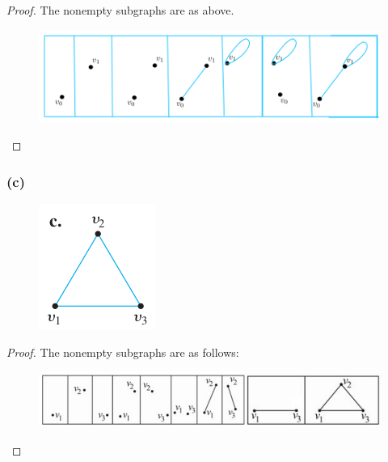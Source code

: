 \documentclass[14pt]{extarticle}
\begin{document}
\begin{proof}
    The nonempty subgraphs are as above.

    \begin{figure}[ht!]
        \centering
        \includegraphics[scale=0.3]{../images/10.1.23.b.2.png}
    \end{figure}
\end{proof}

\subsubsection{(c)}
\begin{figure}[ht!]
    \centering
    \includegraphics[scale=0.5]{../images/10.1.23.c.1.png}
\end{figure}

\begin{proof}
    The nonempty subgraphs are as follows:

    \begin{figure}[ht!]
        \centering
        \includegraphics[scale=0.5]{../images/10.1.23.c.2.png}
    \end{figure}
\end{proof}
\end{document}
